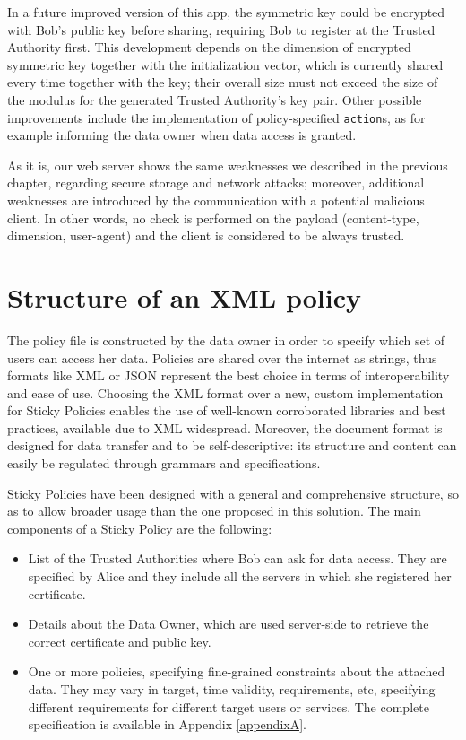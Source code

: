 In a future improved version of this app, the symmetric key could be encrypted with Bob's public key before sharing, requiring Bob to register at the Trusted Authority first. This development depends on the dimension of encrypted symmetric key together with the initialization vector, which is currently shared every time together with the key; their overall size must not exceed the size of the modulus for the generated Trusted Authority's key pair. Other possible improvements include the implementation of policy-specified \texttt{action}s, as for example informing the data owner when data access is granted.

As it is, our web server shows the same weaknesses we described in the previous chapter, regarding secure storage and network attacks; moreover, additional weaknesses are introduced by the communication with a potential malicious client. In other words, no check is performed on the payload (content-type, dimension, user-agent) and the client is considered to be always trusted.

\section{Structure of an XML policy}
The policy file is constructed by the data owner in order to specify which set of users can access her data. Policies are shared over the internet as strings, thus formats like XML or JSON represent the best choice in terms of interoperability and ease of use. Choosing the XML format over a new, custom implementation for Sticky Policies enables the use of well-known corroborated libraries and best practices, available due to XML widespread. Moreover, the document format is designed for data transfer and to be self-descriptive: its structure and content can easily be regulated through grammars and specifications.

Sticky Policies have been designed with a general and comprehensive structure, so as to allow broader usage than the one proposed in this solution. The main components of a Sticky Policy are the following:
\begin{itemize}
	\item List of the Trusted Authorities where Bob can ask for data access. They are specified by Alice and they include all the servers in which she registered her certificate.
	\item Details about the Data Owner, which are used server-side to retrieve the correct certificate and public key.
	\item One or more policies, specifying fine-grained constraints about the attached data. They may vary in target, time validity, requirements, etc, specifying different requirements for different target users or services. The complete specification is available in Appendix \ref{appendixA}.
\end{itemize}

